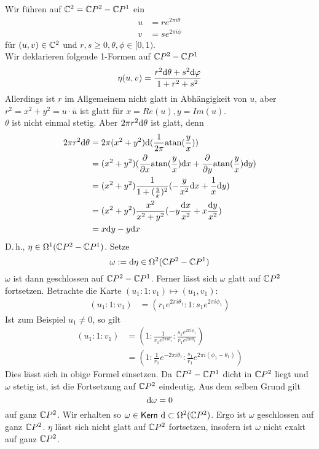 \Def{}
Wir führen  auf $\mathbb{C}^2 = \mathbb{C} P ^2 - \mathbb{C} P ^1$ ein
\begin{align*}
u &= r e^{2\pi i \theta }\\
v &= s e^{2\pi i \phi }
\end{align*}
für $(u,v) \in \mathbb{C}^2$ und $r,s \geq 0, \theta, \phi \in [0,1)$.\\
Wir deklarieren folgende 1-Formen auf $\mathbb{C} P^2 - \mathbb{C} P^1$
\[ \eta(u,v) = \frac{r^2 \text{d} \theta + s^2 \text{d} \varphi}{ 1 + r^2 + s^2 } \]
Allerdings ist $r$ im Allgemeinem nicht glatt in Abhängigkeit von $u$, aber $r^2= x^2 + y^2 = u \cdot \overline{u}$ ist glatt für $x = Re(u), y = Im(u)$.\\
$\theta$ ist nicht einmal stetig. Aber $2\pi r^2 \text{d} \theta$ ist glatt, denn
\begin{align*}
2\pi r^2 \text{d} \theta &= 2\pi (x^2 + y^2) \text{d} (\frac{1}{2\pi} \text{atan}(\frac{y}{x}) )\\
&= (x^2 + y^2)( \frac{\partial}{\partial x} \text{atan}(\frac{y}{x}) \text{d} x +
\frac{\partial }{\partial y} \text{atan}(\frac{y}{x}) \text{d} y )\\
&= (x^2 + y^2) \frac{1}{1 + (\frac{y}{x})^2} (-\frac{y}{x^2}\text{d} x + \frac{1}{x}\text{d} y)\\
&= (x^2 + y^2) \frac{x^2}{x^2 + y^2} (- y \frac{\text{d} x}{x^2} + x \frac{\text{d} y}{x^2})\\
&= x \text{d} y - y \text{d} x
\end{align*}
D.\,h., $\eta \in \Omega^1(\mathbb{C} P^2 - \mathbb{C} P^1)$. Setze
\[ \omega := \text{d} \eta \in \Omega^2(\mathbb{C} P^2 - \mathbb{C} P^1) \]
$\omega$ ist dann geschlossen auf $\mathbb{C} P^2 - \mathbb{C} P ^1$. Ferner lässt sich $\omega$ glatt auf $\mathbb{C} P^2$ fortsetzen. Betrachte die Karte $(u_1 : 1 : v_1) \mapsto (u_1, v_1)$:
\begin{align*}
(u_1 : 1 : v_1) &= (r_1 e^{2\pi i \theta_1} : 1 : s_1 e^{2\pi i \phi_1} )
\end{align*}
Ist zum Beispiel $u_1 \neq 0$, so gilt
\begin{align*}
(u_1 : 1 : v_1) &= (1 : \frac{1}{r_1 e^{2\pi i \theta_1}} : \frac{s_1 e^{2\pi i \phi_1}}{r_1 e^{2\pi i \theta_1}} )\\
&=  (1 : \frac{1}{r_1} e^{-2\pi i \theta_1} : \frac{s_1}{r_1} e^{2\pi i(\phi_1- \theta_1)} )
\end{align*}
Dies lässt sich in obige Formel einsetzen. Da $\mathbb{C} P^2 - \mathbb{C} P^1$ dicht in $\mathbb{C} P^2$ liegt und $\omega$ stetig ist, ist die Fortsetzung auf $\mathbb{C} P^2$ eindeutig. Aus dem selben Grund gilt
\[ \text{d} \omega = 0 \]
auf ganz $\mathbb{C} P ^2$.
Wir erhalten so $\omega \in \textsf{Kern}\ \text{d} \subset \Omega^2(\mathbb{C} P^2)$. Ergo ist $\omega$ geschlossen auf ganz $\mathbb{C} P^2$. 
$\eta$ lässt sich nicht glatt auf $\mathbb{C} P^2$ fortsetzen, insofern ist $\omega$ nicht exakt auf ganz $\mathbb{C} P^2$.\\\\


